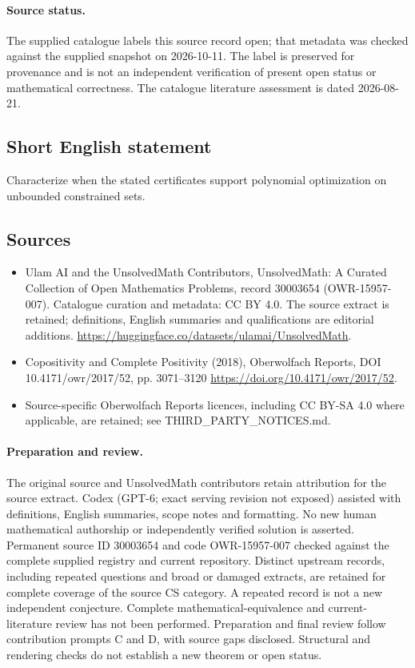 \documentclass[11pt]{article}
\begin{document}
\paragraph{Source status.}
The supplied catalogue labels this source record open; that metadata was checked against the supplied snapshot on 2026-10-11. The label is preserved for provenance and is not an independent verification of present open status or mathematical correctness. The catalogue literature assessment is dated 2026-08-21.
\subsection{Short English statement}
Characterize when the stated certificates support polynomial optimization on unbounded constrained sets.
\subsection{Sources}
\begin{itemize}
\item[S1] Ulam AI and the UnsolvedMath Contributors, UnsolvedMath: A Curated Collection of Open Mathematics Problems, record 30003654 (OWR-15957-007). Catalogue curation and metadata: CC BY 4.0. The source extract is retained; definitions, English summaries and qualifications are editorial additions.
\url{https://huggingface.co/datasets/ulamai/UnsolvedMath}.
\item[S2] Copositivity and Complete Positivity (2018), Oberwolfach Reports, DOI 10.4171/owr/2017/52, pp. 3071--3120
\url{https://doi.org/10.4171/owr/2017/52}.
\item Source-specific Oberwolfach Reports licences, including CC BY-SA 4.0 where applicable, are retained; see THIRD\_PARTY\_NOTICES.md.
\end{itemize}
\paragraph{Preparation and review.}
The original source and UnsolvedMath contributors retain attribution for the source extract. Codex (GPT-6; exact serving revision not exposed) assisted with definitions, English summaries, scope notes and formatting. No new human mathematical authorship or independently verified solution is asserted. Permanent source ID 30003654 and code OWR-15957-007 checked against the complete supplied registry and current repository. Distinct upstream records, including repeated questions and broad or damaged extracts, are retained for complete coverage of the source CS category. A repeated record is not a new independent conjecture. Complete mathematical-equivalence and current-literature review has not been performed. Preparation and final review follow contribution prompts C and D, with source gaps disclosed. Structural and rendering checks do not establish a new theorem or open status.
\label{end:30003654}
\end{document}
